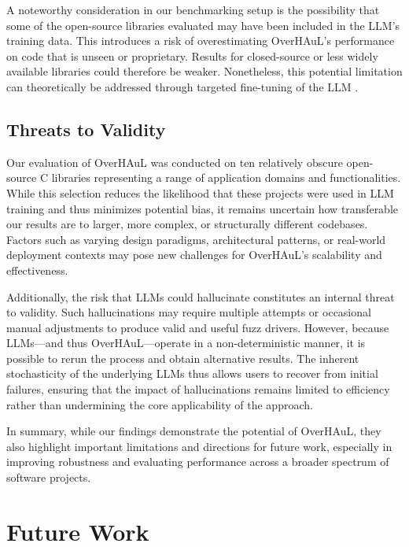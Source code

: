 \documentclass[
  a4paper,
]{scrreprt}
\theoremstyle{definition}
\theoremstyle{remark}
\begin{document}
A noteworthy consideration in our benchmarking setup is the possibility
that some of the open-source libraries evaluated may have been included
in the LLM's training data. This introduces a risk of overestimating
OverHAuL's performance on code that is unseen or proprietary. Results
for closed-source or less widely available libraries could therefore be
weaker. Nonetheless, this potential limitation can theoretically be
addressed through targeted fine-tuning of the LLM
\autocite{openaidocs2025b,kim2025}.

\section{Threats to Validity}\label{threats-to-validity}

Our evaluation of OverHAuL was conducted on ten relatively obscure
open-source C libraries representing a range of application domains and
functionalities. While this selection reduces the likelihood that these
projects were used in LLM training and thus minimizes potential bias, it
remains uncertain how transferable our results are to larger, more
complex, or structurally different codebases. Factors such as varying
design paradigms, architectural patterns, or real-world deployment
contexts may pose new challenges for OverHAuL's scalability and
effectiveness.

Additionally, the risk that LLMs could hallucinate constitutes an
internal threat to validity. Such hallucinations may require multiple
attempts or occasional manual adjustments to produce valid and useful
fuzz drivers. However, because LLMs---and thus OverHAuL---operate in a
non-deterministic manner, it is possible to rerun the process and obtain
alternative results. The inherent stochasticity of the underlying LLMs
thus allows users to recover from initial failures, ensuring that the
impact of hallucinations remains limited to efficiency rather than
undermining the core applicability of the approach.

In summary, while our findings demonstrate the potential of OverHAuL,
they also highlight important limitations and directions for future
work, especially in improving robustness and evaluating performance
across a broader spectrum of software projects.


\chapter{Future Work}\label{future-work}
\end{document}
